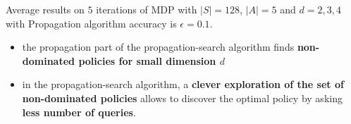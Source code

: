 \documentclass{beamer}
\newcommand{\remark}[1]{{\color{blue}{#1}}}
\begin{document}
\begin{frame}

\begin{table}
\end{table}
Average results on $5$ iterations of MDP with $|S|=128$, $|A| = 5$ and $d = 2,3, 4$ with Propagation algorithm accuracy is $\epsilon = 0.1$.

\end{frame}



\begin{frame}
\remark{propagation-search algorithm}
\begin{itemize}
\item the propagation part of the propagation-search algorithm finds \textbf{non-dominated policies for small dimension $d$}

\item in the propagation-search algorithm, a \textbf{clever exploration of the set of non-dominated policies} allows to discover the optimal policy by asking \textbf{less number of queries}. 
\end{itemize}

\end{frame}
\end{document}
